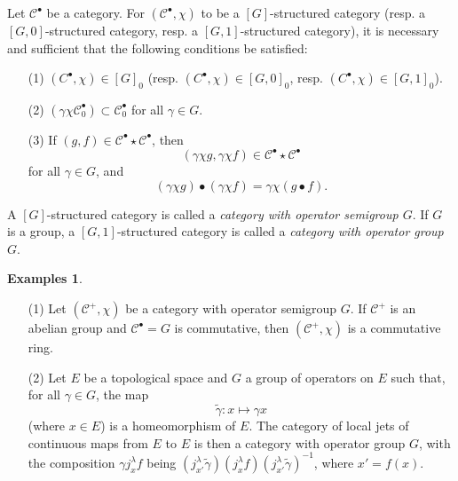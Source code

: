 \documentclass[a4paper,fleqn]{article}
\theoremstyle{plain}
\newenvironment{proposition}[1]
  {\renewcommand\theinnerproposition{#1}\innerproposition}
  {\endinnerproposition}
\theoremstyle{definition}
\newenvironment{definition}[1]
  {\renewcommand\theinnerdefinition{#1}\innerdefinition}
  {\endinnerdefinition}
\newtheorem*{examples}{Examples}
\newcommand{\oldpage}[1]{{\marginpar{\footnotesize$\bigg\vert$\,\,\,\,\textit{p.~#1}}}}
\newcommand{\CC}{\mathcal{C}}
\begin{document}
\begin{proposition}{3}
\label{proposition:ii-3}
  Let $\CC^\bullet$ be a category.
  For $(\CC^\bullet,\chi)$ to be a $[G]$-structured category (resp. a $[G,0]$-structured category, resp. a $[G,1]$-structured category), it is necessary and sufficient that the following conditions be satisfied:

  \begin{enumerate}
    \item[\normalfont(1)]
      $(C^\bullet,\chi)\in[G]_0$ (resp. $(C^\bullet,\chi)\in[G,0]_0$, resp. $(C^\bullet,\chi)\in[G,1]_0$).
    \item[\normalfont(2)]
      $(\gamma\chi\CC_0^\bullet)\subset\CC_0^\bullet$ for all $\gamma\in G$.
    \item[\normalfont(3)]
      If $(g,f)\in\CC^\bullet\star\CC^\bullet$, then
      \[
        (\gamma\chi g,\gamma\chi f)
        \in\CC^\bullet\star\CC^\bullet
      \]
      for all $\gamma\in G$, and
      \[
        (\gamma\chi g)\bullet(\gamma\chi f)
        = \gamma\chi(g\bullet f).
      \]
  \end{enumerate}
\end{proposition}

\oldpage{389}

\begin{definition}{9}
\label{definition:ii-9}
  A $[G]$-structured category is called a \emph{category with operator semigroup $G$}.
  If $G$ is a group, a $[G,1]$-structured category is called a \emph{category with operator group $G$}.
\end{definition}

\begin{examples}
  \begin{enumerate}
    \item[\normalfont(1)]
      Let $(\CC^+,\chi)$ be a category with operator semigroup $G$.
      If $\CC^+$ is an abelian group and $\CC^\bullet=G$ is commutative, then $(\CC^+,\chi)$ is a commutative ring.
    \item[\normalfont(2)]
      Let $E$ be a topological space and $G$ a group of operators on $E$ such that, for all $\gamma\in G$, the map
      \[
        \widetilde{\gamma}\colon x
        \longmapsto \gamma x
      \]
      (where $x\in E$) is a homeomorphism of $E$.
      The category of local jets of continuous maps from $E$ to $E$ is then a category with operator group $G$, with the composition $\gamma j_x^\lambda f$ being $(j_{x'}^\lambda\widetilde{\gamma})(j_x^\lambda f)(j_{x'}^\lambda\widetilde{\gamma})^{-1}$, where $x'=f(x)$.
  \end{enumerate}
\end{examples}
\end{document}
